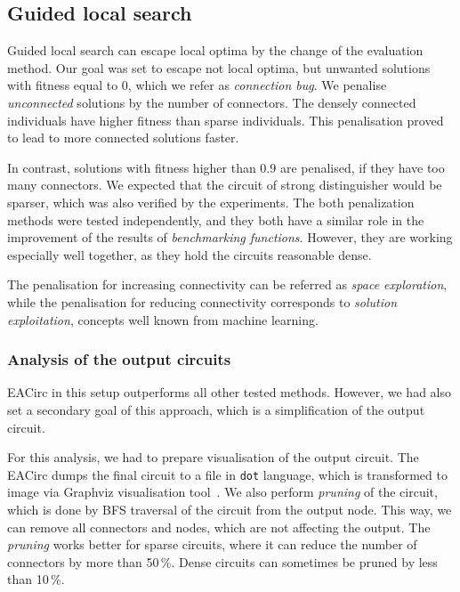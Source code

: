\documentclass[
  print, %
  Table,   %
  nolof,     %
  nolot,     %
  11pt, %
  oneside  %
]{fithesis3}
\begin{document}
\subsection{Guided local search}
\label{subsec:res-ss-gls}

Guided local search can escape local optima by the change of the evaluation method. Our goal was set to escape not local optima, but unwanted solutions with fitness equal to 0, which we refer as \textit{connection bug}. We penalise \textit{unconnected} solutions by the number of connectors. The densely connected individuals have higher fitness than sparse individuals. This penalisation proved to lead to more connected solutions faster.

In contrast, solutions with fitness higher than 0.9 are penalised, if they have too many connectors. We expected that the circuit of strong distinguisher would be sparser, which was also verified by the experiments. The both penalization methods were tested independently, and they both have a similar role in the improvement of the results of \textit{benchmarking functions}. However, they are working especially well together, as they hold the circuits reasonable dense.

The penalisation for increasing connectivity can be referred as \textit{space exploration}, while the penalisation for reducing connectivity corresponds to \textit{solution exploitation}, concepts well known from machine learning.

\subsubsection{Analysis of the output circuits}
\label{subsubsec:res-ss-gls-circ-anal}

EACirc in this setup outperforms all other tested methods. However, we had also set a secondary goal of this approach, which is a simplification of the output circuit.

For this analysis, we had to prepare visualisation of the output circuit. The EACirc dumps the final circuit to a file in \texttt{dot} language, which is transformed to image via Graphviz visualisation tool~\cite{ellson2001graphviz}. We also perform \textit{pruning} of the circuit, which is done by BFS traversal of the circuit from the output node. This way, we can remove all connectors and nodes, which are not affecting the output. The \textit{pruning} works better for sparse circuits, where it can reduce the number of connectors by more than 50\,\%. Dense circuits can sometimes be pruned by less than 10\,\%.
\end{document}
